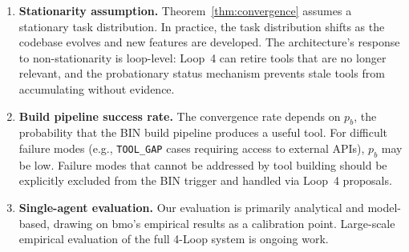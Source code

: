\begin{enumerate}[leftmargin=1.5em]
    \item \textbf{Stationarity assumption.} Theorem~\ref{thm:convergence}
          assumes a stationary task distribution. In practice, the task
          distribution shifts as the codebase evolves and new features are
          developed. The architecture's response to non-stationarity is
          loop-level: Loop~4 can retire tools that are no longer relevant,
          and the probationary status mechanism prevents stale tools from
          accumulating without evidence.

    \item \textbf{Build pipeline success rate.} The convergence rate depends
          on $p_b$, the probability that the BIN build pipeline produces a
          useful tool. For difficult failure modes (e.g., \texttt{TOOL\_GAP}
          cases requiring access to external APIs), $p_b$ may be low.
          Failure modes that cannot be addressed by tool building should
          be explicitly excluded from the BIN trigger and handled via
          Loop~4 proposals.

    \item \textbf{Single-agent evaluation.} Our evaluation is primarily
          analytical and model-based, drawing on bmo's empirical results
          as a calibration point. Large-scale empirical evaluation of the
          full 4-Loop system is ongoing work.
\end{enumerate}

